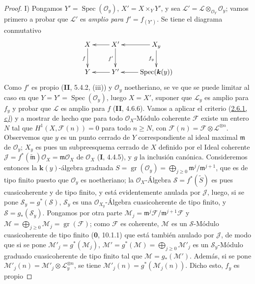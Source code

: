 \begin{proof}
\noindent I) Pongamos
$Y'=\operatorname{Spec}(\mathcal O_y)$, $X'=X\times_YY'$, y sea
$\mathcal L'=\mathcal L\otimes_{\mathcal O_Y}\mathcal O_y$;
vamos primero a probar que $\mathcal L'$ es \emph{amplio para}
$f'=f_{(Y')}$. Se tiene el diagrama conmutativo
\[
\xymatrix{
X\ar[d]_f & X'\ar[l]\ar[d]_{f'} & X_y\ar[l]\ar[d]_{f_y}\\
Y & Y'\ar[l] & \operatorname{Spec}(\boldsymbol{k}(y))\ar[l]
}
\]
Como $f'$ es propio (\textbf{II}, 5.4.2, (iii)) y $\mathcal O_y$ noetheriano, se
ve que se puede limitar al caso en que
$Y=Y'=\operatorname{Spec}(\mathcal O_y)$, luego $X=X'$, suponer que
$\mathcal L_y$ es amplio para $f_y$ y probar que $\mathcal L$ es amplio
para $f$ (\textbf{II}, 4.6.6). Vamos a aplicar el criterio
(\hyperref[III.2.6.1-fr]{2.6.1, \emph{c)}}) y a mostrar de hecho que para todo
$\mathcal O_X$-Módulo coherente $\mathcal F$ existe un entero $N$ tal que
$H^1(X,\mathcal F(n))=0$ para todo $n\geq N$, con
$\mathcal F(n)=\mathcal F\otimes\mathcal L^{\otimes n}$.
Observemos que $y$ es un punto cerrado de $Y$ correspondiente al ideal maximal
$\mathfrak m$ de $\mathcal O_y$; $X_y$ es pues un subpreesquema cerrado de
$X$ definido por el Ideal coherente
$\mathcal J=f^*(\widetilde{\mathfrak m})\mathcal O_X=
\mathfrak m\mathcal O_X$ de $\mathcal O_X$ (\textbf{I}, 4.4.5), y $g$ la inclusión
canónica. Consideremos entonces la $\boldsymbol{k}(y)$-álgebra graduada
$S=\operatorname{gr}(\mathcal O_y)
=\bigoplus_{j\geq0}\mathfrak m^j/\mathfrak m^{j+1}$,
que es de tipo finito puesto que $\mathcal O_y$ es noetheriano; la
$\mathcal O_X$-Álgebra $\mathcal S=f^*(\widetilde S)$ es pues
cuasicoherente y de tipo finito, y está evidentemente anulada por
$\mathcal J$, luego, si se pone $\mathcal S_y=g^*(\mathcal S)$,
$\mathcal S_y$ es una $\mathcal O_{X_y}$-Álgebra cuasicoherente de tipo
finito, y $\mathcal S=g_*(\mathcal S_y)$. Pongamos por otra parte
$\mathcal M_j=\mathfrak m^j\mathcal F/\mathfrak m^{j+1}\mathcal F$ y
$\mathcal M=\bigoplus_{j\geq0}\mathcal M_j
=\operatorname{gr}(\mathcal F)$;
como $\mathcal F$ es coherente, $\mathcal M$ es un $\mathcal S$-Módulo
cuasicoherente de tipo finito (\textbf{0}, 10.1.1) que está también anulado por
$\mathcal J$, de modo que si se pone
$\mathcal M'_j=g^*(\mathcal M_j)$, $\mathcal M'=g^*(\mathcal M)=\bigoplus_{j\geq0}\mathcal M'_j$
es un $\mathcal S_y$-Módulo graduado cuasicoherente de tipo
finito tal que $\mathcal M=g_*(\mathcal M')$. Además, si se pone
$\mathcal M'_j(n)=\mathcal M'_j\otimes\mathcal L_y^{\otimes n}$, se tiene
$\mathcal M'_j(n)=g^*(\mathcal M_j(n))$. Dicho esto, $f_y$ es propio

\end{proof}
